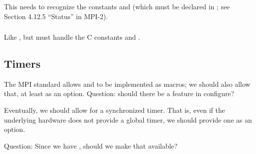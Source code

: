 \documentclass{article}
\begin{document}

\subsubsection{}
This needs to recognize the constants  and
 (which must be declared in ; see
Section 4.12.5 ``Status'' in MPI-2).  

\subsubsection{}
Like , but must handle the C constants
 and .

\subsection{Timers}
The MPI standard allows  and  to be
implemented as macros; we should also allow that, at least as an
option.  Question:  should there be a
 feature in
configure?

Eventually, we should allow for a synchronized timer.  That is, even
if the underlying hardware does not provide a global timer, we should
provide one as an option.

Question: Since we have , should we make that available?
\end{document}
